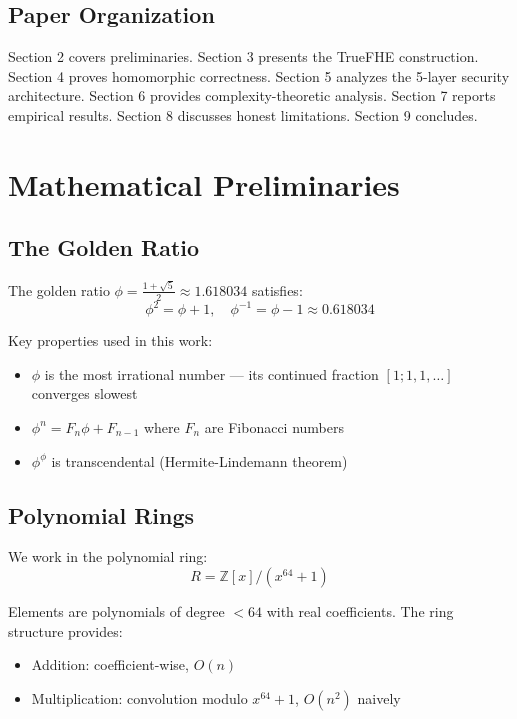 \documentclass[11pt,a4paper]{article}
\theoremstyle{remark}
\begin{document}
\subsection{Paper Organization}

Section 2 covers preliminaries. Section 3 presents the TrueFHE construction. Section 4 proves homomorphic correctness. Section 5 analyzes the 5-layer security architecture. Section 6 provides complexity-theoretic analysis. Section 7 reports empirical results. Section 8 discusses honest limitations. Section 9 concludes.

\section{Mathematical Preliminaries}

\subsection{The Golden Ratio}

The golden ratio $\phi = \frac{1+\sqrt{5}}{2} \approx 1.618034$ satisfies:
\begin{equation}
    \phi^2 = \phi + 1, \quad \phi^{-1} = \phi - 1 \approx 0.618034
\end{equation}

Key properties used in this work:
\begin{itemize}
    \item $\phi$ is the most irrational number — its continued fraction $[1;1,1,\ldots]$ converges slowest
    \item $\phi^n = F_n\phi + F_{n-1}$ where $F_n$ are Fibonacci numbers
    \item $\phi^\phi$ is transcendental (Hermite-Lindemann theorem)
\end{itemize}

\subsection{Polynomial Rings}

We work in the polynomial ring:
\begin{equation}
    R = \mathbb{Z}[x]/(x^{64} + 1)
\end{equation}

Elements are polynomials of degree $< 64$ with real coefficients. The ring structure provides:
\begin{itemize}
    \item Addition: coefficient-wise, $O(n)$
    \item Multiplication: convolution modulo $x^{64}+1$, $O(n^2)$ naively
\end{itemize}
\end{document}
